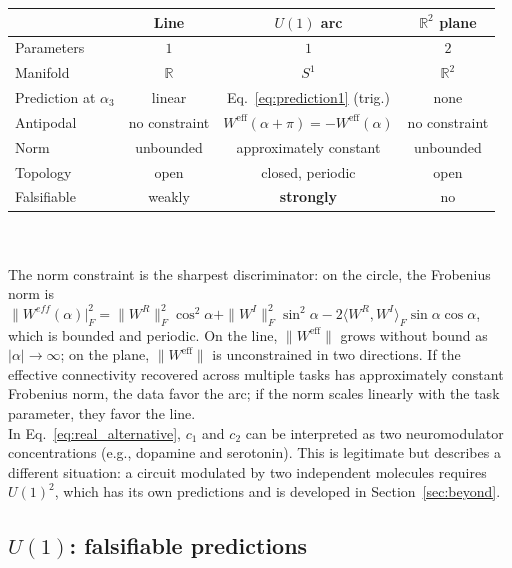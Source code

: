 \documentclass[11pt,a4paper]{article}
\newcommand{\R}{\mathbb{R}}
\newcommand{\Weff}{W^{\text{eff}}}
\begin{document}
{\begin{center}
\renewcommand{\arraystretch}{1.3}
\begin{tabular}{@{}lccc@{}}
\toprule
& \textbf{Line} & \textbf{$U(1)$ arc} & \textbf{$\R^2$ plane} \\
\midrule
Parameters & $1$ & $1$ & $2$ \\
Manifold & $\R$ & $S^1$ & $\R^2$ \\
Prediction at $\alpha_3$ & 
linear & Eq.~\eqref{eq:prediction1} (trig.) & none \\
Antipodal & no constraint & 
$\Weff(\alpha{+}\pi) = -\Weff(\alpha)$ & no constraint \\
Norm & unbounded & approximately constant & unbounded \\
Topology & open & closed, periodic & open \\
Falsifiable & weakly & \textbf{strongly} & no \\
\bottomrule
\end{tabular}
\end{center}
\\
\\
The norm constraint is the sharpest discriminator: on the circle, 
the Frobenius norm is $\|W^{eff}(\alpha)|_F^2 = \|W^R\|_F^2\cos^2\alpha 
+ \|W^I\|_F^2\sin^2\alpha - 2\langle W^R, W^I\rangle_F 
\sin\alpha\cos\alpha$, which is bounded and periodic. On the line, 
$\|\Weff\|$ grows without bound as $|\alpha| \to \infty$; on the 
plane, $\|\Weff\|$ is unconstrained in two directions. If the 
effective connectivity recovered across multiple tasks has 
approximately constant Frobenius norm, the data favor the arc; if 
the norm scales linearly with the task parameter, they favor the 
line. 
\\
In Eq.~\eqref{eq:real_alternative}, $c_1$ and $c_2$ can be 
interpreted as two neuromodulator concentrations (e.g., dopamine and serotonin). This is legitimate but describes a different situation: a circuit modulated by two independent molecules requires $U(1)^2$, which has its own predictions and is developed in Section~\ref{sec:beyond}.

\subsection{$U(1)$: falsifiable predictions}
\label{sec:predictions}

}
\end{document}
